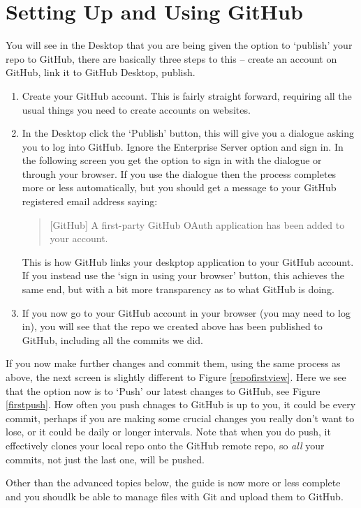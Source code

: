 \documentclass[a4paper, 12pt]{article}
\begin{document}
\section{Setting Up and Using GitHub}
You will see in the Desktop that you are being given the option to `publish' your repo to GitHub, there are basically three steps to this -- create an account on GitHub, link it to GitHub Desktop, publish.
\begin{enumerate}
\item Create your GitHub account. This is fairly straight forward, requiring all the usual things you need to create accounts on websites.
\item In the Desktop click the `Publish' button, this will give you a dialogue asking you to log into GitHub. Ignore the Enterprise Server option and sign in. In the following screen you get the option to sign in with the dialogue or through your browser. If you use the dialogue then the process completes more or less automatically, but you should get a message to your GitHub registered email address saying:
\begin{quote}
[GitHub] A first-party GitHub OAuth application has been added to your account.
\end{quote}
This is how GitHub links your deskptop application to your GitHub account. If you instead use the `sign in using your browser' button, this achieves the same end, but with a bit more transparency as to what GitHub is doing.
\item If you now go to your GitHub account in your browser (you may need to log in), you will see that the repo we created above has been published to GitHub, including all the commits we did.
\end{enumerate}
If you now make further changes and commit them, using the same process as above, the next screen is slightly different to Figure \ref{repofirstview}. Here we see that the option now is to `Push' our latest changes to GitHub, see Figure \ref{firstpush}. How often you push chnages to GitHub is up to you, it could be every commit, perhaps if you are making some crucial changes you really don't want to lose, or it could be daily or longer intervals. Note that when you do push, it effectively clones your local repo onto the GitHub remote repo, so \textit{all} your commits, not just the last one, will be pushed.

Other than the advanced topics below, the guide is now more or less complete and you shoudlk be able to manage files with Git and upload them to GitHub.
\end{document}
